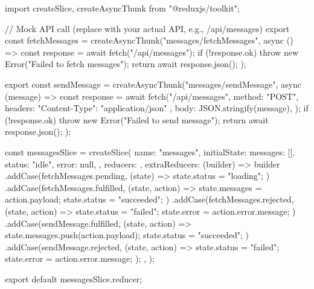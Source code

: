 import { createSlice, createAsyncThunk } from "@reduxjs/toolkit";

// Mock API call (replace with your actual API, e.g., /api/messages)
export const fetchMessages = createAsyncThunk("messages/fetchMessages", async () => {
  const response = await fetch("/api/messages");
  if (!response.ok) throw new Error("Failed to fetch messages");
  return await response.json();
});

export const sendMessage = createAsyncThunk("messages/sendMessage", async (message) => {
  const response = await fetch("/api/messages", {
    method: "POST",
    headers: { "Content-Type": "application/json" },
    body: JSON.stringify(message),
  });
  if (!response.ok) throw new Error("Failed to send message");
  return await response.json();
});

const messagesSlice = createSlice({
  name: "messages",
  initialState: {
    messages: [],
    status: "idle",
    error: null,
  },
  reducers: {},
  extraReducers: (builder) => {
    builder
      .addCase(fetchMessages.pending, (state) => {
        state.status = "loading";
      })
      .addCase(fetchMessages.fulfilled, (state, action) => {
        state.messages = action.payload;
        state.status = "succeeded";
      })
      .addCase(fetchMessages.rejected, (state, action) => {
        state.status = "failed";
        state.error = action.error.message;
      })
      .addCase(sendMessage.fulfilled, (state, action) => {
        state.messages.push(action.payload);
        state.status = "succeeded";
      })
      .addCase(sendMessage.rejected, (state, action) => {
        state.status = "failed";
        state.error = action.error.message;
      });
  },
});

export default messagesSlice.reducer;
